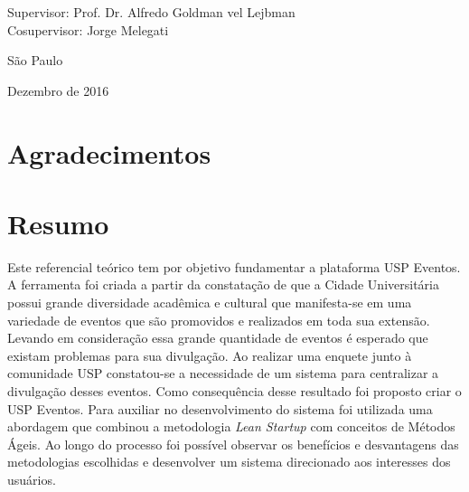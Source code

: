 \documentclass[12pt,twoside,a4paper]{book}
\begin{document}
    \vskip 5cm

    \begin{center}
    Supervisor: Prof. Dr. Alfredo Goldman vel Lejbman\\
    Cosupervisor: Jorge Melegati

    \vskip 5cm
    \normalsize{São Paulo}

    \normalsize{Dezembro de 2016}
    \end{center}
\pagebreak




\chapter*{Agradecimentos}



\chapter*{Resumo}
    \par Este referencial teórico tem por objetivo fundamentar a plataforma USP Eventos. A ferramenta foi criada a partir da constatação de que a Cidade Universitária possui grande diversidade acadêmica e cultural que manifesta-se em uma variedade de eventos que são promovidos e realizados em toda sua extensão. Levando em consideração essa grande quantidade de eventos é esperado que existam problemas para sua divulgação. Ao realizar uma enquete junto à comunidade USP constatou-se a necessidade de um sistema para centralizar a divulgação desses eventos. Como consequência desse resultado foi proposto criar o USP Eventos. Para auxiliar no desenvolvimento do sistema foi utilizada uma abordagem que combinou a metodologia \emph{Lean Startup} com conceitos de Métodos Ágeis. Ao longo do processo foi possível observar os benefícios e desvantagens das metodologias escolhidas e desenvolver um sistema direcionado aos interesses dos usuários.
\\
\end{document}
